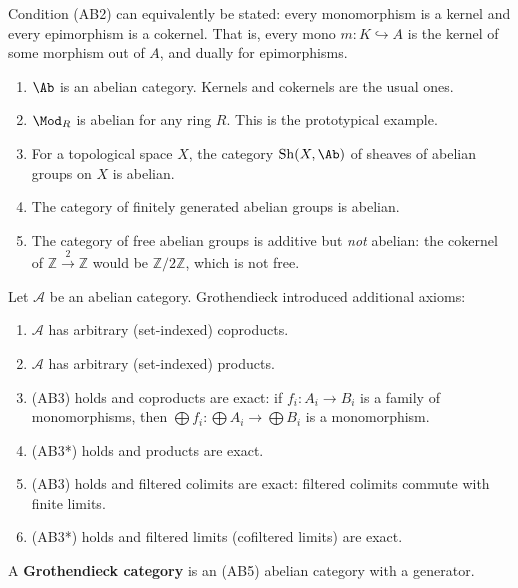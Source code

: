 \begin{remark}\label{rem:abelian-equiv}
Condition (AB2) can equivalently be stated: every monomorphism is a kernel and
every epimorphism is a cokernel. That is, every mono $m \colon K \hookrightarrow A$ is
the kernel of some morphism out of $A$, and dually for epimorphisms.
\end{remark}

\begin{example}\label{ex:abelian-examples}
\begin{enumerate}
    \item{}
    $\Ab$ is an abelian category. Kernels and cokernels are the usual ones.
    \item{}
    $\Mod_R$ is abelian for any ring $R$. This is the prototypical example.
    \item{}
    For a topological space $X$, the category $\operatorname{Sh}(X, \Ab)$ of sheaves of
    abelian groups on $X$ is abelian.
    \item The category of finitely generated abelian groups is abelian.
    \item{}
    The category of free abelian groups is additive but \emph{not} abelian: the cokernel
    of $\mathbb{Z} \xrightarrow{2} \mathbb{Z}$ would be $\mathbb{Z}/2\mathbb{Z}$, which
    is not free.
\end{enumerate}
\end{example}

\begin{definition}\label{def:grothendieck-axioms}
Let $\mathcal{A}$ be an abelian category. Grothendieck introduced additional axioms:
\begin{enumerate}
    \item[(AB3)] $\mathcal{A}$ has arbitrary (set-indexed) coproducts.
    \item[(AB3*)] $\mathcal{A}$ has arbitrary (set-indexed) products.
    \item[(AB4)] (AB3) holds and coproducts are exact: if $f_i \colon A_i \to B_i$ is a
    family of monomorphisms, then $\bigoplus f_i \colon \bigoplus A_i \to \bigoplus B_i$
    is a monomorphism.
    \item[(AB4*)] (AB3*) holds and products are exact.
    \item[(AB5)] (AB3) holds and filtered colimits are exact: filtered colimits commute
    with finite limits.
    \item[(AB5*)] (AB3*) holds and filtered limits (cofiltered limits) are exact.
\end{enumerate}
A \textbf{Grothendieck category} is an (AB5) abelian category
with a generator.
\end{definition}

